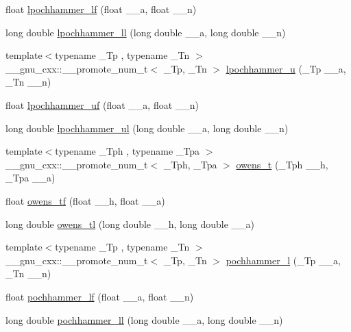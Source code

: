 \begin{DoxyCompactItemize}
\item 
float \hyperlink{namespace____gnu__cxx_afb9f3fc457d83f83769297fb172397d6}{lpochhammer\+\_\+lf} (float \+\_\+\+\_\+a, float \+\_\+\+\_\+n)
\item 
long double \hyperlink{namespace____gnu__cxx_a6ba405212d353633ef5ee41f683c4630}{lpochhammer\+\_\+ll} (long double \+\_\+\+\_\+a, long double \+\_\+\+\_\+n)
\item 
{\footnotesize template$<$typename \+\_\+\+Tp , typename \+\_\+\+Tn $>$ }\\\+\_\+\+\_\+gnu\+\_\+cxx\+::\+\_\+\+\_\+promote\+\_\+num\+\_\+t$<$ \+\_\+\+Tp, \+\_\+\+Tn $>$ \hyperlink{namespace____gnu__cxx_a85e5565a30599065b8ccbc499c5d0d85}{lpochhammer\+\_\+u} (\+\_\+\+Tp \+\_\+\+\_\+a, \+\_\+\+Tn \+\_\+\+\_\+n)
\item 
float \hyperlink{namespace____gnu__cxx_a023cc1af92f09d35fc84a19119108980}{lpochhammer\+\_\+uf} (float \+\_\+\+\_\+a, float \+\_\+\+\_\+n)
\item 
long double \hyperlink{namespace____gnu__cxx_a44db837251d1d0db819b0215c98f569e}{lpochhammer\+\_\+ul} (long double \+\_\+\+\_\+a, long double \+\_\+\+\_\+n)
\item 
{\footnotesize template$<$typename \+\_\+\+Tph , typename \+\_\+\+Tpa $>$ }\\\+\_\+\+\_\+gnu\+\_\+cxx\+::\+\_\+\+\_\+promote\+\_\+num\+\_\+t$<$ \+\_\+\+Tph, \+\_\+\+Tpa $>$ \hyperlink{namespace____gnu__cxx_a7a52e8d5df5b110810c4bdba78a9d2ae}{owens\+\_\+t} (\+\_\+\+Tph \+\_\+\+\_\+h, \+\_\+\+Tpa \+\_\+\+\_\+a)
\item 
float \hyperlink{namespace____gnu__cxx_ac24d32e9b072c4953654d5559f992871}{owens\+\_\+tf} (float \+\_\+\+\_\+h, float \+\_\+\+\_\+a)
\item 
long double \hyperlink{namespace____gnu__cxx_a7a8bc60dc0ef4a009586872eb7cac2d0}{owens\+\_\+tl} (long double \+\_\+\+\_\+h, long double \+\_\+\+\_\+a)
\item 
{\footnotesize template$<$typename \+\_\+\+Tp , typename \+\_\+\+Tn $>$ }\\\+\_\+\+\_\+gnu\+\_\+cxx\+::\+\_\+\+\_\+promote\+\_\+num\+\_\+t$<$ \+\_\+\+Tp, \+\_\+\+Tn $>$ \hyperlink{namespace____gnu__cxx_afed029416c3c440fea35a3a135991436}{pochhammer\+\_\+l} (\+\_\+\+Tp \+\_\+\+\_\+a, \+\_\+\+Tn \+\_\+\+\_\+n)
\item 
float \hyperlink{namespace____gnu__cxx_a66c7ea176dad7f06f19cc80e860f333c}{pochhammer\+\_\+lf} (float \+\_\+\+\_\+a, float \+\_\+\+\_\+n)
\item 
long double \hyperlink{namespace____gnu__cxx_adec5630d81fc1d3f6f61146a2d16fafc}{pochhammer\+\_\+ll} (long double \+\_\+\+\_\+a, long double \+\_\+\+\_\+n)

\end{DoxyCompactItemize}
